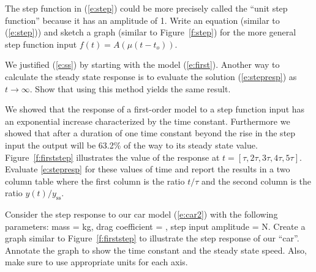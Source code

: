 \begin{ex}
The step function in (\ref{e:step}) could be more precisely called the ``unit step function'' because it has an amplitude of 1.  Write an equation (similar to (\ref{e:step})) and sketch a graph (similar to Figure~\ref{f:step}) for the more general step function input $f(t) = A(\mu(t-t_o))$.
\end{ex}

\begin{ex}
We justified (\ref{e:ss}) by starting with the model (\ref{e:first}).  Another way to calculate the steady state response is to evaluate the solution (\ref{e:stepresp}) as $t \to \infty$.  Show that using this method yields the same result.
\end{ex}

\begin{ex}
We showed that the response of a first-order model to a step function input has an exponential increase characterized by the time constant.  Furthermore we showed that after a duration of one time constant beyond the rise in the step input the output will be 63.2\% of the way to its steady state value.  Figure~\ref{f:firststep} illustrates the value of the response at  $t=[\tau,2\tau,3\tau,4\tau,5\tau]$.  Evaluate \ref{e:stepresp} for these values of time and report the results in a two column table where the first column is the ratio $t/\tau$ and the second column is the ratio $y(t)/y_{\mathrm{ss}}$.
\end{ex}

\begin{ex}
Consider the step response to our car model (\ref{e:car2}) with the following parameters: mass = \unit[750]{kg}, drag coefficient = , step input amplitude = \unit[10,000]{N}.  Create a graph similar to Figure~\ref{f:firststep} to illustrate the step response of our ``car''.  Annotate the graph to show the time constant and the steady state speed.  Also, make sure to use appropriate units for each axis.
\end{ex}

